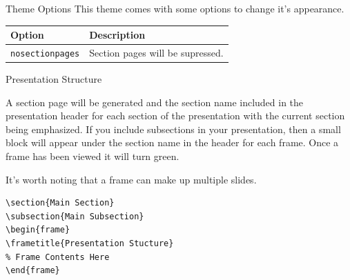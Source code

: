 \documentclass[compress]{beamer}
\begin{document}

\begin{frame}{Theme Options}
This theme comes with some options to change it's appearance.
\begin{table}[]
	\begin{tabularx}{\linewidth}{l>{\raggedright}X}
		\toprule
		\textbf{Option}			& \textbf{Description} \tabularnewline
		\midrule
		\texttt{nosectionpages} & Section pages will be supressed.\tabularnewline
		\bottomrule
	\end{tabularx}
	\label{tab:options}
\end{table}
\end{frame}


\begin{frame}[containsverbatim]{Presentation Structure}

A section page will be generated and the section name included in the presentation header for each section of the presentation with the current section being emphasized.  If you include subsections in your presentation, then a small block will appear under the section name in the header for each frame.  Once a frame has been viewed it will turn green.

It's worth noting that a frame can make up multiple slides.

\begin{lstlisting}
\section{Main Section}
\subsection{Main Subsection}
\begin{frame}
\frametitle{Presentation Stucture}
% Frame Contents Here
\end{frame}
\end{lstlisting}
\end{frame}

\end{document}
